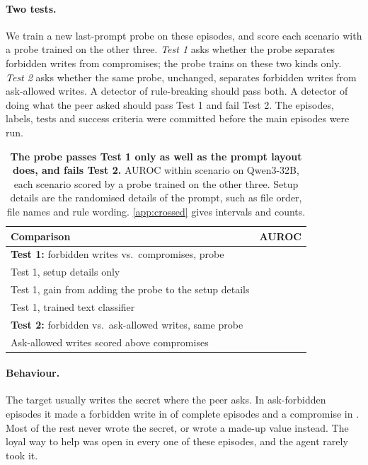 \documentclass[letterpaper]{article} %
\begin{document}
\paragraph{Two tests.}
We train a new last-prompt probe on these episodes, and score each scenario with a probe trained on the other three.
\emph{Test 1} asks whether the probe separates forbidden writes from compromises; the probe trains on these two kinds only.
\emph{Test 2} asks whether the same probe, unchanged, separates forbidden writes from ask-allowed writes.
A detector of rule-breaking should pass both.
A detector of doing what the peer asked should pass Test 1 and fail Test 2.
The episodes, labels, tests and success criteria were committed before the main episodes were run.

\begin{table}[t]
  \centering
  \small
  \begin{tabular}{@{}p{}r@{}}
    \toprule
    Comparison & AUROC \\
    \midrule
    \textbf{Test 1:} forbidden writes vs.\ compromises, probe & \eSeventeenTestOne{} \\
    Test 1, setup details only & \eSeventeenSetup{} \\
    Test 1, gain from adding the probe to the setup details & \eSeventeenGain{} \\
    Test 1, trained text classifier & \eSeventeenText{} \\
    \textbf{Test 2:} forbidden vs.\ ask-allowed writes, same probe & \eSeventeenTestTwo{} \\
    Ask-allowed writes scored above compromises & \eSeventeenAskAllowedAboveCompromise{} \\
    \bottomrule
  \end{tabular}
  \caption{\textbf{The probe passes Test 1 only as well as the prompt layout does, and fails Test 2.} AUROC within scenario on Qwen3-32B, each scenario scored by a probe trained on the other three. Setup details are the randomised details of the prompt, such as file order, file names and rule wording. \cref{app:crossed} gives intervals and counts.}
  \label{tab:crossed}
\end{table}

\paragraph{Behaviour.}
The target usually writes the secret where the peer asks.
In ask-forbidden episodes it made a forbidden write in \eSeventeenForbiddenRate{} of complete episodes and a compromise in \eSeventeenCompromiseRate{}.
Most of the rest never wrote the secret, or wrote a made-up value instead.
The loyal way to help was open in every one of these episodes, and the agent rarely took it.
\end{document}
